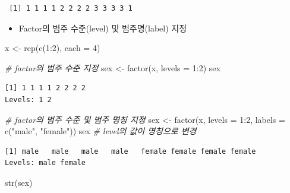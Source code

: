 \documentclass[
  11pt,
]{krantz}
\newenvironment{Shaded}{\begin{snugshade}}{\end{snugshade}}
\newcommand{\AttributeTok}[1]{\textcolor[rgb]{0.61,0.61,0.61}{#1}}
\newcommand{\CommentTok}[1]{\textcolor[rgb]{0.37,0.37,0.37}{\textit{#1}}}
\newcommand{\DecValTok}[1]{\textcolor[rgb]{0.06,0.06,0.06}{#1}}
\newcommand{\FunctionTok}[1]{\textcolor[rgb]{0,0,0}{#1}}
\newcommand{\NormalTok}[1]{#1}
\newcommand{\OtherTok}[1]{\textcolor[rgb]{0.37,0.37,0.37}{#1}}
\newcommand{\SpecialCharTok}[1]{\textcolor[rgb]{0,0,0}{#1}}
\newcommand{\StringTok}[1]{\textcolor[rgb]{0.5,0.5,0.5}{#1}}
\providecommand{\tightlist}{%
  \setlength{\itemsep}{0pt}\setlength{\parskip}{0pt}}
\begin{document}
\begin{verbatim}
 [1] 1 1 1 1 2 2 2 2 3 3 3 3 1
\end{verbatim}

\normalsize

\begin{itemize}
\tightlist
\item
  Factor의 범주 수준(level) 및 범주명(label) 지정
\end{itemize}

\footnotesize

\begin{Shaded}
\begin{Highlighting}[]
\NormalTok{x }\OtherTok{\textless{}{-}} \FunctionTok{rep}\NormalTok{(}\FunctionTok{c}\NormalTok{(}\DecValTok{1}\SpecialCharTok{:}\DecValTok{2}\NormalTok{), }\AttributeTok{each =} \DecValTok{4}\NormalTok{)}

\CommentTok{\# factor의 범주 수준 지정}
\NormalTok{sex }\OtherTok{\textless{}{-}} \FunctionTok{factor}\NormalTok{(x, }\AttributeTok{levels =} \DecValTok{1}\SpecialCharTok{:}\DecValTok{2}\NormalTok{)}
\NormalTok{sex}
\end{Highlighting}
\end{Shaded}

\begin{verbatim}
[1] 1 1 1 1 2 2 2 2
Levels: 1 2
\end{verbatim}

\begin{Shaded}
\begin{Highlighting}[]
\CommentTok{\# factor의 범주 수준 및 범주 명칭 지정}
\NormalTok{sex }\OtherTok{\textless{}{-}} \FunctionTok{factor}\NormalTok{(x, }\AttributeTok{levels =} \DecValTok{1}\SpecialCharTok{:}\DecValTok{2}\NormalTok{, }\AttributeTok{labels =} \FunctionTok{c}\NormalTok{(}\StringTok{"male"}\NormalTok{, }\StringTok{"female"}\NormalTok{))}
\NormalTok{sex }\CommentTok{\# level의 값이 명칭으로 변경}
\end{Highlighting}
\end{Shaded}

\begin{verbatim}
[1] male   male   male   male   female female female female
Levels: male female
\end{verbatim}

\begin{Shaded}
\begin{Highlighting}[]
\FunctionTok{str}\NormalTok{(sex)}
\end{Highlighting}
\end{Shaded}
\end{document}
